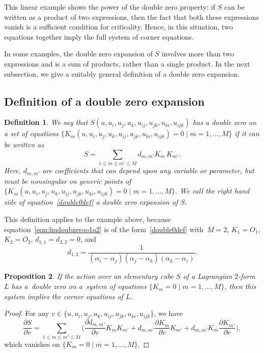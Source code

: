 \documentclass[10pt,a4paper]{amsart}
\newcommand{\pdv}[2]{\frac{\partial {#1}}{\partial {#2}}}
\newtheorem{Definition}{Definition}[section]
\newtheorem{Proposition}[Definition]{Proposition}
\numberwithin{equation}{section}
\begin{document}
This linear example shows the power of the double zero property: if $S$ can be written as a product of two expressions, then the fact that both these expressions vanish is a sufficient condition for criticality. Hence, in this situation, two equations together imply the full system of corner equations.

In some examples, the double zero expansion of $S$ involves more than two expressions and is a sum of products, rather than a single product. In the next subsection, we give a suitably general definition of a double zero expansion.

\subsection{Definition of a double zero expansion}

\begin{Definition}\label{def:doublezero}
 We say that $S(u,u_i,u_j,u_k,u_{ij},u_{jk},u_{ki},u_{ijk})$ has a \emph{double zero} on a set of equations $\{ K_m(u,u_i,u_j,u_k,u_{ij},u_{jk},u_{ki},u_{ijk})=0 \mid m = 1, \dots, M \}$ if it can be written as
 \begin{equation}
 \label{double0def}
 S = \sum_{1 \leq m \leq m' \leq M} d_{m,m'} K_m \, K_{m'} .
 \end{equation}
 Here, $d_{m,m'}$ are coefficients that can depend upon any variable or parameter, but must be nonsingular on generic points of $\{ K_m(u,u_i,u_j,u_k,u_{ij},u_{jk},u_{ki},u_{ijk})=0 \mid m = 1, \dots, M \}$.
 We call the right hand side of equation~\eqref{double0def} a \emph{double zero expansion} of $S$.
\end{Definition}

This definition applies to the example above, because equation~\eqref{eqn:lindoubzeroo1o2} is of the form~\eqref{double0def} with~${M=2}$, $K_1 = O_1$, $K_2 = O_2$, $d_{1,1} = d_{2,2} = 0$, and
\[d_{1,2} = \frac{1}{(\alpha_i - \alpha_j)(\alpha_j - \alpha_k)(\alpha_k - \alpha_i)} .\]

\begin{Proposition}
 If the action over an elementary cube $S$ of a Lagrangian $2$-form $L$ has a~double zero on a~system of equations $\{ K_m=0 \mid m = 1, \dots, M\}$, then this system implies the corner equations of $L$.
\end{Proposition}
\begin{proof}
 For any $v \in \{u,u_i,u_j,u_k,u_{ij},u_{jk},u_{ki},u_{ijk}\}$, we have
 \[
 \pdv{S}{v} = \sum_{1 \leq m \leq m' \leq M} \biggl( \pdv{d_{m,m'}}{v} K_m K_{m'} + d_{m,m'} \pdv{K_m}{v} K_{m'} + d_{m,m'} K_m \pdv{K_{m'}}{v} \biggr),
 \]
 which vanishes on $\{ K_m=0 \mid m = 1, \dots, M \}$.
\end{proof}
\end{document}
